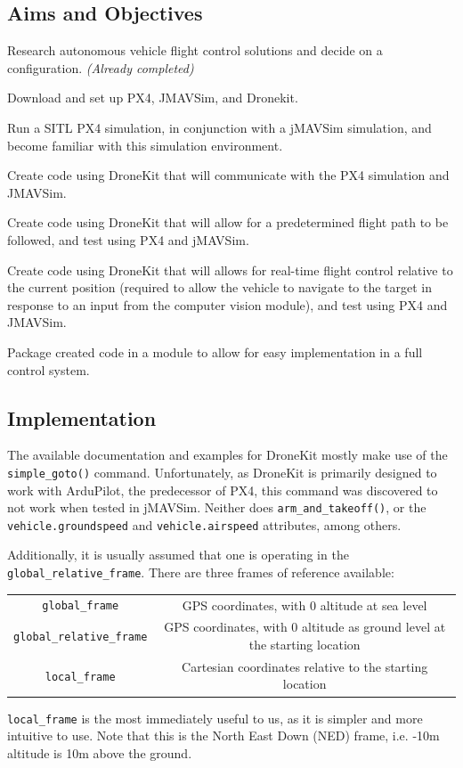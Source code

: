 \documentclass[11pt]{article}
\begin{document}
\subsection{Aims and Objectives}
\begin{compactenum}
    \item Research autonomous vehicle flight control solutions and decide on a configuration. \emph{(Already completed)}
    \item Download and set up PX4, JMAVSim, and Dronekit.
    \item Run a SITL PX4 simulation, in conjunction with a jMAVSim simulation, and become familiar with this simulation environment.
    \item Create code using DroneKit that will communicate with the PX4 simulation and JMAVSim.
    \item Create code using DroneKit that will allow for a predetermined flight path to be followed, and test using PX4 and jMAVSim.
    \item Create code using DroneKit that will allows for real-time flight control relative to the current position (required to allow the vehicle to navigate to the target in response to an input from the computer vision module), and test using PX4 and JMAVSim.
    \item Package created code in a module to allow for easy implementation in a full control system.
\end{compactenum}


\subsection{Implementation} \label{control_implementation}
The available documentation and examples for DroneKit mostly make use of the \lstinline|simple_goto()| command\cite{PX4_dev_guide}\cite{dronekit}. Unfortunately, as DroneKit is primarily designed to work with ArduPilot, the predecessor of PX4, this command was discovered to not work when tested in jMAVSim. Neither does \lstinline|arm_and_takeoff()|, or the \lstinline|vehicle.groundspeed| and \lstinline|vehicle.airspeed| attributes, among others.

Additionally, it is usually assumed that one is operating in the \lstinline|global_relative_frame|. There are three frames of reference available:
\begin{center}
\begin{tabular}{cc}
    \lstinline|global_frame| & GPS coordinates, with 0 altitude at sea level \\
    \lstinline|global_relative_frame| & GPS coordinates, with 0 altitude as ground level at the starting location \\
    \lstinline|local_frame| & Cartesian coordinates relative to the starting location
\end{tabular}
\end{center}
\lstinline|local_frame| is the most immediately useful to us, as it is simpler and more intuitive to use. Note that this is the North East Down (NED) frame, i.e. -10m altitude is 10m above the ground.
\end{document}
